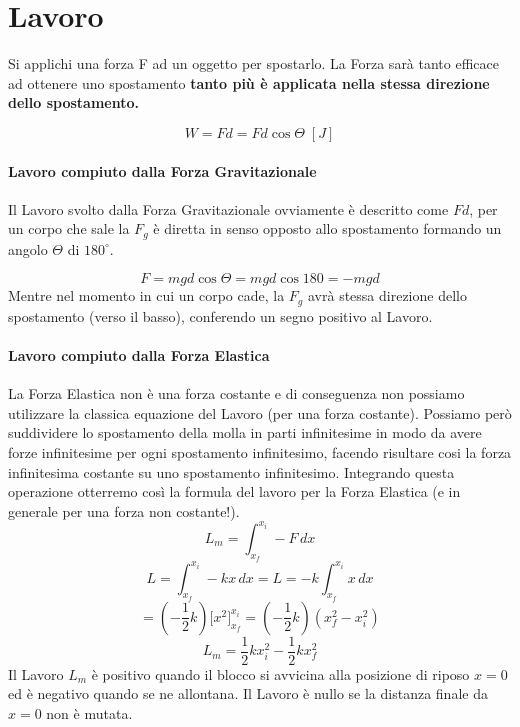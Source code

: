     \section{Lavoro} Si applichi una forza F ad un oggetto per spostarlo. La 
    Forza sarà tanto efficace ad ottenere uno spostamento \textbf{tanto più
    è applicata nella stessa direzione dello spostamento.}

        \begin{equation}
            W = Fd = Fd \cos \Theta \; [J]
        \end{equation}

        \paragraph{Lavoro compiuto dalla Forza Gravitazionale} Il Lavoro svolto 
        dalla Forza Gravitazionale ovviamente è descritto come $F d$, per un 
        corpo che sale la $F_g$ è diretta in senso opposto allo spostamento 
        formando un angolo $\Theta$ di $180^{\circ}$.
        
        \begin{equation}
            F = mgd\cos \Theta = mgd \cos 180 = - mgd
        \end{equation}
        Mentre nel momento in cui un corpo cade, la $F_g$ avrà stessa direzione
        dello spostamento (verso il basso), conferendo un segno positivo al
        Lavoro.
        
        \paragraph{Lavoro compiuto dalla Forza Elastica} La Forza Elastica non è
        una forza costante e di conseguenza non possiamo utilizzare la classica
        equazione del Lavoro (per una forza costante). Possiamo però suddividere
        lo spostamento della molla in parti infinitesime in modo da avere forze
        infinitesime per ogni spostamento infinitesimo, facendo risultare cosi 
        la forza infinitesima costante su uno spostamento infinitesimo. 
        Integrando questa operazione otterremo così la formula del lavoro per
        la Forza Elastica (e in generale per una forza non costante!).
        \begin{equation*}
            L_m = \int_{x_f}^{x_i} -F \,dx 
        \end{equation*}
        \begin{equation*}
            L = \int_{x_f}^{x_i} -kx \,dx =  L = -k \int_{x_f}^{x_i} x \,dx   
        \end{equation*}
        \begin{equation*}
            = (-\frac{1}{2}k)\bigg[x^2 \bigg]_{x_f}^{x_i}
            = (-\frac{1}{2}k) (x^2_f - x^2_i)
        \end{equation*}
        \begin{equation}
            L_m = \frac{1}{2}kx^2_i - \frac{1}{2}kx^2_f
        \end{equation}
        Il Lavoro $L_m$ è positivo quando il blocco si avvicina alla posizione 
        di riposo $x=0$ ed è negativo quando se ne allontana. Il Lavoro è nullo
        se la distanza finale da $x=0$ non è mutata.

